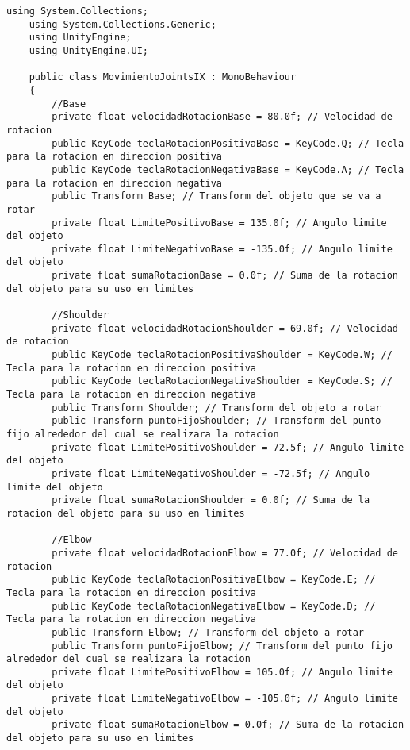 \begin{lstlisting}[frame=single]
    using System.Collections;
    using System.Collections.Generic;
    using UnityEngine;
    using UnityEngine.UI;
    
    public class MovimientoJointsIX : MonoBehaviour
    {
        //Base
        private float velocidadRotacionBase = 80.0f; // Velocidad de rotacion
        public KeyCode teclaRotacionPositivaBase = KeyCode.Q; // Tecla para la rotacion en direccion positiva
        public KeyCode teclaRotacionNegativaBase = KeyCode.A; // Tecla para la rotacion en direccion negativa
        public Transform Base; // Transform del objeto que se va a rotar
        private float LimitePositivoBase = 135.0f; // Angulo limite del objeto
        private float LimiteNegativoBase = -135.0f; // Angulo limite del objeto
        private float sumaRotacionBase = 0.0f; // Suma de la rotacion del objeto para su uso en limites
    
        //Shoulder
        private float velocidadRotacionShoulder = 69.0f; // Velocidad de rotacion
        public KeyCode teclaRotacionPositivaShoulder = KeyCode.W; // Tecla para la rotacion en direccion positiva
        public KeyCode teclaRotacionNegativaShoulder = KeyCode.S; // Tecla para la rotacion en direccion negativa
        public Transform Shoulder; // Transform del objeto a rotar
        public Transform puntoFijoShoulder; // Transform del punto fijo alrededor del cual se realizara la rotacion
        private float LimitePositivoShoulder = 72.5f; // Angulo limite del objeto
        private float LimiteNegativoShoulder = -72.5f; // Angulo limite del objeto
        private float sumaRotacionShoulder = 0.0f; // Suma de la rotacion del objeto para su uso en limites
    
        //Elbow
        private float velocidadRotacionElbow = 77.0f; // Velocidad de rotacion
        public KeyCode teclaRotacionPositivaElbow = KeyCode.E; // Tecla para la rotacion en direccion positiva
        public KeyCode teclaRotacionNegativaElbow = KeyCode.D; // Tecla para la rotacion en direccion negativa
        public Transform Elbow; // Transform del objeto a rotar
        public Transform puntoFijoElbow; // Transform del punto fijo alrededor del cual se realizara la rotacion
        private float LimitePositivoElbow = 105.0f; // Angulo limite del objeto
        private float LimiteNegativoElbow = -105.0f; // Angulo limite del objeto
        private float sumaRotacionElbow = 0.0f; // Suma de la rotacion del objeto para su uso en limites
    

\end{lstlisting}
